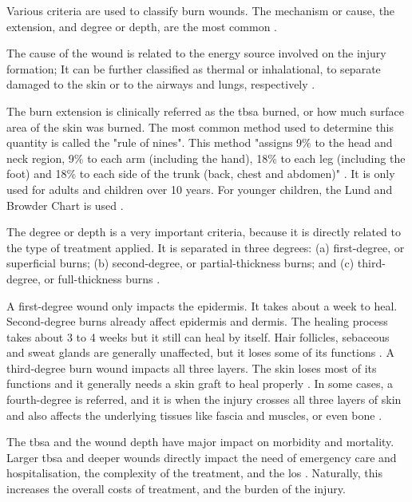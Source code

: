 Various criteria are used to classify burn wounds. The mechanism or cause, the extension, and degree or depth, are the most common \cite{who_unicef2008_burns_chapter}. 

The cause of the wound is related to the energy source involved on the injury formation; It can be further classified as thermal or inhalational, to separate damaged to the skin or to the airways and lungs, respectively \cite{who_unicef2008_burns_chapter}.

The burn extension is clinically referred as the \gls{tbsa} burned, or how much surface area of the skin was burned. The most common method used to determine this quantity is called the "rule of nines". This method "assigns 9\% to the head and neck region, 9\% to each arm (including the hand), 18\% to each leg (including the foot) and 18\% to each side of the trunk (back, chest and abdomen)" \cite{who_unicef2008_burns_chapter}. It is only used for adults and children over 10 years. For younger children, the Lund and Browder Chart is used \cite{MacLennan1998_anesthesia_thermal_injury}. 

The degree or depth is a very important criteria, because it is directly related to the type of treatment applied. It is separated in three degrees: (a) first-degree, or superficial burns; (b) second-degree, or partial-thickness burns; and (c) third-degree, or full-thickness burns \cite{who_unicef2008_burns_chapter}. 

A first-degree wound only impacts the epidermis. It takes about a week to heal. Second-degree burns already affect epidermis and dermis. The healing process takes about 3 to 4 weeks but it still can heal by itself. Hair follicles, sebaceous and sweat glands are generally unaffected, but it loses some of its functions \cite{Tortora2009_principles_anatomy_physiology}. A third-degree burn wound impacts all three layers. The skin loses most of its functions \cite{Tortora2009_principles_anatomy_physiology} and it generally needs a skin graft to heal properly \cite{who_unicef2008_burns_chapter}. In some cases, a fourth-degree is referred, and it is when the injury crosses all three layers of skin and also affects the underlying tissues like fascia and muscles, or even bone \cite{Vijayavenkataraman2016_stateart_modelling_materials_processing}. 

The \gls{tbsa} and the wound depth have major impact on morbidity and mortality. Larger \gls{tbsa} and deeper wounds directly impact the need of emergency care and hospitalisation, the complexity of the treatment, and the \gls{los} \cite{Santos_2016_burden_burns_portugal, Bartosch_2013_mortality_lengthofstay}. Naturally, this increases the overall costs of treatment, and the burden of the injury. 

